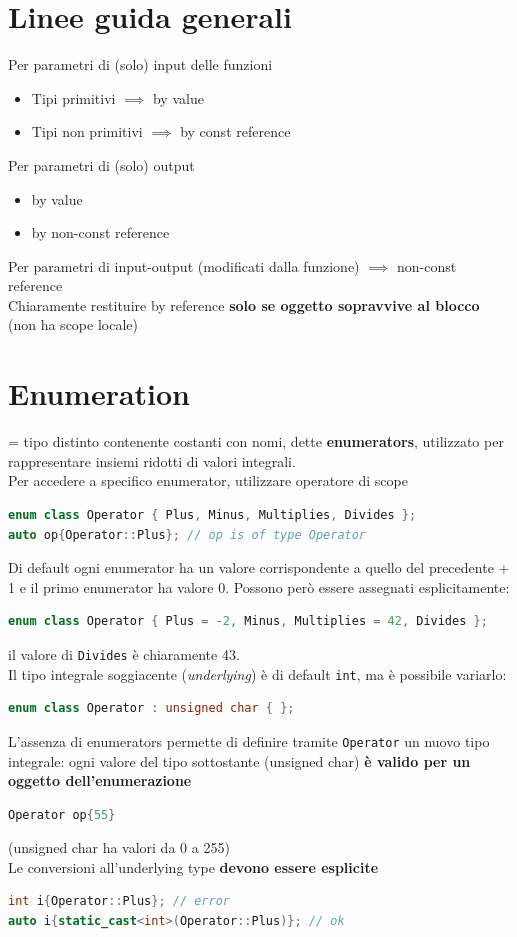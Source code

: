\documentclass[10pt, oneside]{book}
\begin{document}
\section{Linee guida generali}
Per parametri di (solo) input delle funzioni
\begin{itemize}
\item Tipi primitivi $\implies$ by value
\item Tipi non primitivi $\implies$ by const reference
\end{itemize}
Per parametri di (solo) output
\begin{itemize}
\item by value
\item by non-const reference
\end{itemize}
Per parametri di input-output (modificati dalla funzione) $\implies$ non-const reference\\
Chiaramente restituire by reference \textbf{solo se oggetto sopravvive al blocco} (non ha scope locale)

\section{Enumeration}
= tipo distinto contenente costanti con nomi, dette \textbf{enumerators}, utilizzato per rappresentare insiemi ridotti di valori integrali.\\
Per accedere a specifico enumerator, utilizzare operatore di scope
\begin{lstlisting}[language=C++]
enum class Operator { Plus, Minus, Multiplies, Divides };
auto op{Operator::Plus}; // op is of type Operator
\end{lstlisting}
Di default ogni enumerator ha un valore corrispondente a quello del precedente + 1 e il primo enumerator ha valore 0. Possono però essere assegnati esplicitamente:
\begin{lstlisting}[language=C++]
enum class Operator { Plus = -2, Minus, Multiplies = 42, Divides };
\end{lstlisting}
il valore di \texttt{Divides} è chiaramente 43.\\
Il tipo integrale soggiacente (\textit{underlying}) è di default \texttt{int}, ma è possibile variarlo:
\begin{lstlisting}[language=C++]
enum class Operator : unsigned char { };
\end{lstlisting}
L'assenza di enumerators permette di definire tramite \texttt{Operator} un nuovo tipo integrale: ogni valore del tipo sottostante (unsigned char) \textbf{è valido per un oggetto dell'enumerazione}
\begin{lstlisting}[language=C++]
Operator op{55}
\end{lstlisting}
(unsigned char ha valori da 0 a 255)\\
Le conversioni all'underlying type \textbf{devono essere esplicite}
\begin{lstlisting}[language=C++]
int i{Operator::Plus}; // error
auto i{static_cast<int>(Operator::Plus)}; // ok
\end{lstlisting}
\end{document}
